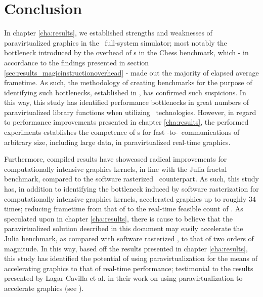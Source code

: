 
\chapter{Conclusion}
\label{cha:conclusion}
In chapter \ref{cha:results}, we established strengths and weaknesses of paravirtualized graphics in the \dvttermsimics\ full-system simulator; most notably the bottleneck introduced by the overhead of \dvttermmagicinstruction s in the Chess benchmark, which - in accordance to the findings presented in section \ref{sec:results_magicinstructionoverhead} - made out the majority of elapsed average frametime.
As such, the methodology of creating benchmarks for the purpose of identifying such bottlenecks, established in , has confirmed such suspicions.
In this way, this study has identified performance bottlenecks in great numbers of paravirtualized library functions when utilizing \dvttermmagicinstruction\ technologies.
However, in regard to performance improvements presented in chapter \ref{cha:results}, the performed experiments establishes the competence of \dvttermmagicinstruction s for fast \dvttermtarget -to-\dvttermhost\ communications of arbitrary size, including large data, in paravirtualized real-time graphics.

Furthermore, compiled results have showcased radical improvements for computationally intensive graphics kernels, in line with the Julia fractal benchmark, compared to the software rasterized \dvttermsimics\ counterpart.
As such, this study has, in addition to identifying the bottleneck induced by software rasterization for computationally intensive graphics kernels, accelerated graphics up to roughly $34$ times; reducing frametime from that of  to the real-time feasible count of .
As speculated upon in chapter \ref{cha:results}, there is cause to believe that the paravirtualized solution described in this document may easily accelerate the Julia benchmark, as compared with software rasterized \dvttermsimics , to that of two orders of magnitude.
In this way, based off the results presented in chapter \ref{cha:results}, this study has identified the potential of using paravirtualization for the means of accelerating graphics to that of real-time performance; testimonial to the results presented by Lagar-Cavilla et al. in their work on using paravirtualization to accelerate graphics (see ).

